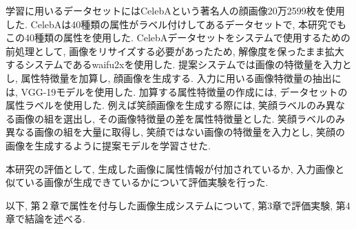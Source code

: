 学習に用いるデータセットにはCelebAという著名人の顔画像20万2599枚を使用した. CelebAは40種類の属性がラベル付けしてあるデータセットで, 本研究でもこの40種類の属性を使用した. CelebAデータセットをシステムで使用するための前処理として, 画像をリサイズする必要があったため, 解像度を保ったまま拡大するシステムであるwaifu2xを使用した. 提案システムでは画像の特徴量を入力とし, 属性特徴量を加算し, 顔画像を生成する. 入力に用いる画像特徴量の抽出には, VGG-19モデルを使用した\cite{vgg}. 加算する属性特徴量の作成には, データセットの属性ラベルを使用した. 例えば笑顔画像を生成する際には, 笑顔ラベルのみ異なる画像の組を選出し, その画像特徴量の差を属性特徴量とした. 笑顔ラベルのみ異なる画像の組を大量に取得し, 笑顔ではない画像の特徴量を入力とし, 笑顔の画像を生成するように提案モデルを学習させた. 


本研究の評価として, 生成した画像に属性情報が付加されているか, 入力画像と似ている画像が生成できているかについて評価実験を行った. 

以下, 第２章で属性を付与した画像生成システムについて, 第3章で評価実験, 第4章で結論を述べる. 
